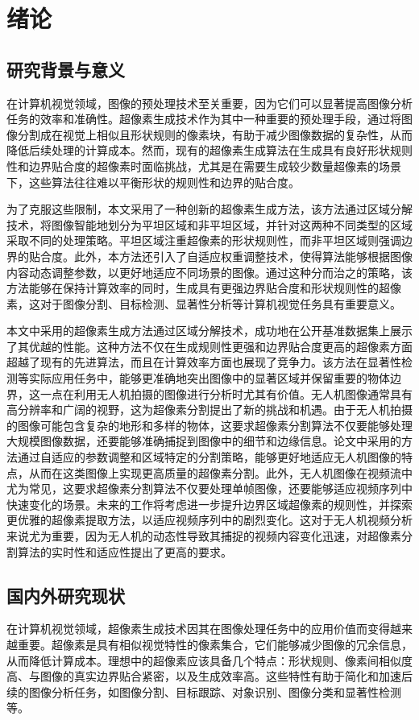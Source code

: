 \section{绪论}
\subsection{研究背景与意义}

在计算机视觉领域，图像的预处理技术至关重要，因为它们可以显著提高图像分析任务的效率和准确性。超像素生成技术作为其中一种重要的预处理手段，通过将图像分割成在视觉上相似且形状规则的像素块，有助于减少图像数据的复杂性，从而降低后续处理的计算成本。然而，现有的超像素生成算法在生成具有良好形状规则性和边界贴合度的超像素时面临挑战，尤其是在需要生成较少数量超像素的场景下，这些算法往往难以平衡形状的规则性和边界的贴合度。

为了克服这些限制，本文采用了一种创新的超像素生成方法，该方法通过区域分解技术，将图像智能地划分为平坦区域和非平坦区域，并针对这两种不同类型的区域采取不同的处理策略。平坦区域注重超像素的形状规则性，而非平坦区域则强调边界的贴合度。此外，本方法还引入了自适应权重调整技术，使得算法能够根据图像内容动态调整参数，以更好地适应不同场景的图像。通过这种分而治之的策略，该方法能够在保持计算效率的同时，生成具有更强边界贴合度和形状规则性的超像素，这对于图像分割、目标检测、显著性分析等计算机视觉任务具有重要意义。

本文中采用的超像素生成方法通过区域分解技术，成功地在公开基准数据集上展示了其优越的性能。这种方法不仅在生成规则性更强和边界贴合度更高的超像素方面超越了现有的先进算法，而且在计算效率方面也展现了竞争力。该方法在显著性检测等实际应用任务中，能够更准确地突出图像中的显著区域并保留重要的物体边界，这一点在利用无人机拍摄的图像进行分析时尤其有价值。无人机图像通常具有高分辨率和广阔的视野，这为超像素分割提出了新的挑战和机遇。由于无人机拍摄的图像可能包含复杂的地形和多样的物体，这要求超像素分割算法不仅要能够处理大规模图像数据，还要能够准确捕捉到图像中的细节和边缘信息。论文中采用的方法通过自适应的参数调整和区域特定的分割策略，能够更好地适应无人机图像的特点，从而在这类图像上实现更高质量的超像素分割。此外，无人机图像在视频流中尤为常见，这要求超像素分割算法不仅要处理单帧图像，还要能够适应视频序列中快速变化的场景。\cite{王国良2021一种基于}未来的工作将考虑进一步提升边界区域超像素的规则性，并探索更优雅的超像素提取方法，以适应视频序列中的剧烈变化。这对于无人机视频分析来说尤为重要，因为无人机的动态性导致其捕捉的视频内容变化迅速，对超像素分割算法的实时性和适应性提出了更高的要求。

\subsection{国内外研究现状}
在计算机视觉领域，超像素生成技术因其在图像处理任务中的应用价值而变得越来越重要。超像素是具有相似视觉特性的像素集合，它们能够减少图像的冗余信息，从而降低计算成本。理想中的超像素应该具备几个特点：形状规则、像素间相似度高、与图像的真实边界贴合紧密，以及生成效率高。这些特性有助于简化和加速后续的图像分析任务，如图像分割、目标跟踪、对象识别、图像分类和显著性检测等。

